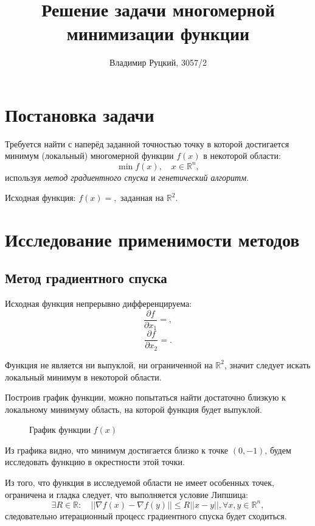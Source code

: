 \documentclass[10pt,a4paper,titlepage]{article}
\title{Решение задачи многомерной минимизации функции}
\author{Владимир Руцкий, 3057/2}
\newcommand\RR{\mathbb{R}}
\begin{document}
\maketitle
\thispagestyle{empty}

\section{Постановка задачи}
Требуется найти с наперёд заданной точностью точку в которой достигается минимум (локальный) многомерной функции $f(x)$ 
в некоторой области:
$$ \min f(x), \quad x \in \RR^n, $$
используя \textit{метод градиентного спуска} и \textit{генетический алгоритм}.

Исходная функция: $f(x) = ,$ заданная на $\RR^2.$ %

\section{Исследование применимости методов}
\subsection{Метод градиентного спуска}
Исходная функция непрерывно дифференцируема:
$$
  \frac{\partial f}{\partial x_1} = ,
$$
$$
  \frac{\partial f}{\partial x_2} = .
$$

Функция не является ни выпуклой, ни ограниченной на $\RR^2$, значит следует искать локальный минимум в некоторой области.

Построив график функции, можно попытаться найти достаточно близкую к локальному минимуму область, 
на которой функция будет выпуклой.
\begin{figure}[h]
  \label{function-graph}
  \caption{График функции $f(x)$}
  \begin{center}
  
  \end{center}
\end{figure}

Из графика видно, что минимум достигается близко к точке $(0, -1)$, будем исследовать функцию в окрестности этой точки.

Из того, что функция в исследуемой области не имеет особенных точек, ограничена и гладка следует, 
что выполняется условие Липшица:
$$
  \exists R \in \RR: \quad \left|\left| \nabla f(x) - \nabla f(y) \right|\right| \leqslant R || x - y ||, \forall x, y \in \RR^n,
$$
следовательно итерационный процесс градиентного спуска будет сходиться.
\end{document}
